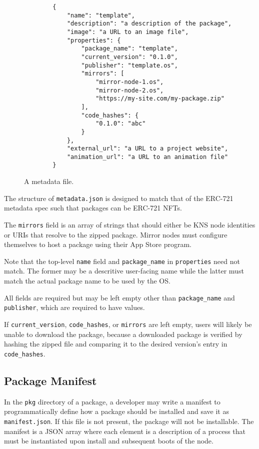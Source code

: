 \documentclass[runningheads]{llncs}
\begin{document}
\begin{figure}[H]
    \centering
    \begin{verbatim}
        {
            "name": "template",
            "description": "a description of the package",
            "image": "a URL to an image file",
            "properties": {
                "package_name": "template",
                "current_version": "0.1.0",
                "publisher": "template.os",
                "mirrors": [
                    "mirror-node-1.os",
                    "mirror-node-2.os",
                    "https://my-site.com/my-package.zip"
                ],
                "code_hashes": {
                    "0.1.0": "abc"
                }
            },
            "external_url": "a URL to a project website",
            "animation_url": "a URL to an animation file"
        }
    \end{verbatim}
    \caption{A metadata file.}
    \label{fig:example metadata.json}
\end{figure}

The structure of \verb|metadata.json| is designed to match that of the ERC-721 metadata spec such that packages can be ERC-721 NFTs.

The \verb|mirrors| field is an array of strings that should either be KNS node identities or URIs that resolve to the zipped package.
Mirror nodes must configure themselves to host a package using their App Store program.

Note that the top-level \verb|name| field and \verb|package_name| in \verb|properties| need not match. The former may be a descritive user-facing name while the latter must match the actual package name to be used by the OS.

All fields are required but may be left empty other than \verb|package_name| and \verb|publisher|, which are required to have values.

If \verb|current_version|, \verb|code_hashes|, or \verb|mirrors| are left empty, users will likely be unable to download the package, because a downloaded package is verified by hashing the zipped file and comparing it to the desired version's entry in \verb|code_hashes|.

\subsection{Package Manifest}
\label{sec:packagemanagermanifest}

In the \verb|pkg| directory of a package, a developer may write a manifest to programmatically define how a package should be installed and save it as \verb|manifest.json|.
If this file is not present, the package will not be installable.
The manifest is a JSON array where each element is a description of a process that must be instantiated upon install and subsequent boots of the node.
\end{document}
